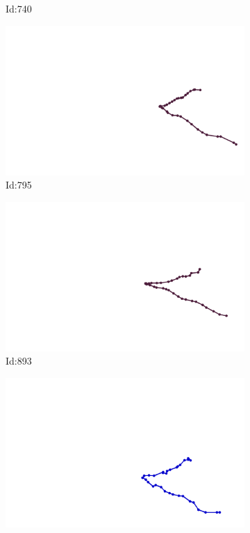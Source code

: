 \documentclass[12pt,twoside]{report}
\begin{document}
\begin{figure}
\begin{subfigure}[b]{0.20\textwidth}
\caption{Id:740}
\end{subfigure}
\begin{subfigure}[b]{0.20\textwidth}
\centering
\includegraphics[width=\textwidth]{../trajectories/795.png}
\caption{Id:795}
\end{subfigure}
\begin{subfigure}[b]{0.20\textwidth}
\centering
\includegraphics[width=\textwidth]{../trajectories/893.png}
\caption{Id:893}
\end{subfigure}
\begin{subfigure}[b]{0.20\textwidth}
\centering
\includegraphics[width=\textwidth]{../trajectories/917.png}

\end{subfigure}
\end{figure}
\end{document}
